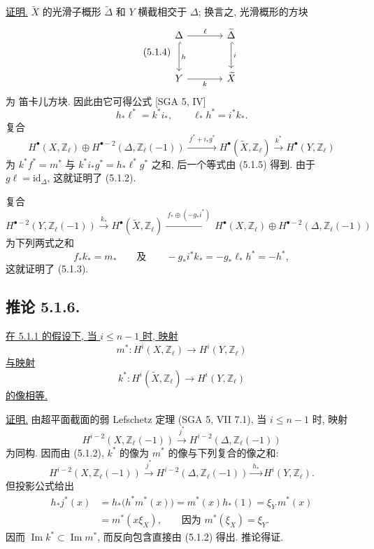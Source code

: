 \underline{证明.}
$\widetilde X$ 的光滑子概形 $\widetilde\Delta$ 和 $Y$ 横截相交于 $\Delta$; 换言之, 光滑概形的方块
\begin{equation}\tag{5.1.4}
\begin{tikzcd}[column sep=large,row sep=large]
\Delta\arrow[r,"\ell"]\arrow[d,hook,"h"]
  &\widetilde\Delta\arrow[d,hook,"i"]\\
Y\arrow[r,"k"']&\widetilde X
\end{tikzcd}
\end{equation}
为 笛卡儿方块. 因此由它可得公式 [SGA 5, IV]
\begin{equation}\tag{5.1.5}
h_*\ell^*=k^*i_* ,\qquad \ell_*h^*=i^*k_*.
\end{equation}
复合
\[
H^\bullet(X,\mathbb Z_\ell)\oplus
H^{\bullet-2}(\Delta,\mathbb Z_\ell(-1))
\xrightarrow{\ f^*+i_*g^*\ }
H^\bullet(\widetilde X,\mathbb Z_\ell)
\xrightarrow{\ k^*\ }
H^\bullet(Y,\mathbb Z_\ell)
\]
为 $k^*f^*=m^*$ 与 $k^*i_*g^*=h_*\ell^*g^*$ 之和, 后一个等式由 (5.1.5) 得到. 由于 $g\ell=\mathrm{id}_\Delta$, 这就证明了 (5.1.2).

复合
\[
H^{\bullet-2}(Y,\mathbb Z_\ell(-1))
\xrightarrow{\ k_*\ }
H^\bullet(\widetilde X,\mathbb Z_\ell)
\xrightarrow{\ f_*\oplus(-g_*i^*)\ }
H^\bullet(X,\mathbb Z_\ell)\oplus
H^{\bullet-2}(\Delta,\mathbb Z_\ell(-1))
\]
为下列两式之和
\[
f_*k_*=m_*
\qquad\text{及}\qquad
-g_*i^*k_*=-g_*\ell_*h^*=-h^*,
\]
这就证明了 (5.1.3).

\subsection*{推论 5.1.6.}
\underline{在 5.1.1 的假设下, 当 $i\leq n-1$ 时, 映射}
\[
m^*:H^i(X,\mathbb Z_\ell)\longrightarrow H^i(Y,\mathbb Z_\ell)
\]
\underline{与映射}
\[
k^*:H^i(\widetilde X,\mathbb Z_\ell)
   \longrightarrow H^i(Y,\mathbb Z_\ell)
\]
\underline{的像相等.}

\underline{证明.}
由超平面截面的弱 Lefschetz 定理 (SGA 5, VII 7.1), 当 $i\leq n-1$ 时, 映射
\begin{equation}\tag{5.1.7}
H^{i-2}(X,\mathbb Z_\ell(-1))
\xrightarrow{\ j^*\ }
H^{i-2}(\Delta,\mathbb Z_\ell(-1))
\end{equation}
为同构. 因而由 (5.1.2), $k^*$ 的像为 $m^*$ 的像与下列复合的像之和:
\[
H^{i-2}(X,\mathbb Z_\ell(-1))
\xrightarrow{\ j^*\ }
H^{i-2}(\Delta,\mathbb Z_\ell(-1))
\xrightarrow{\ h_*\ }
H^i(Y,\mathbb Z_\ell).
\]
但投影公式给出
\[
\begin{aligned}
h_*j^*(x)
 &=h_*\bigl(h^*m^*(x)\bigr)
  =m^*(x)h_*(1)
  =\xi_Y\,m^*(x)\\
 &=m^*(x\xi_X),
 \qquad\text{因为 }m^*(\xi_X)=\xi_Y.
\end{aligned}
\]
因而 $\operatorname{Im}k^*\subset\operatorname{Im}m^*$, 而反向包含直接由 (5.1.2) 得出. 推论得证.
